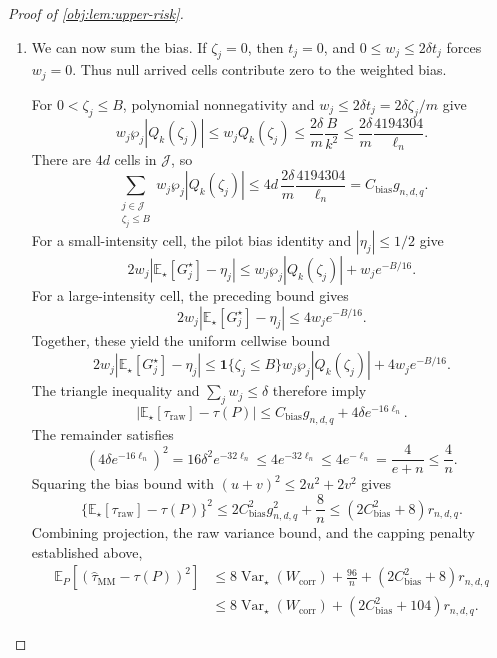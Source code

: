 \begin{proof}[Proof of \cref{obj:lem:upper-risk}]
\begin{enumerate}
For \(\zeta_j\ge B\), Cauchy--Schwarz and \(\wp_j^2\le\wp_j\) yield
\[
\{\wp_j|\mathbb E_\star[H_j^\star]|\}^2
\le\wp_j\mathbb E_\star[(H_j^\star)^2]
\le e^{-\zeta_j/8},
\]
and hence
\[
\wp_j|\mathbb E_\star[H_j^\star]|
\le e^{-\zeta_j/16}.
\]
Using
\(\eta_jQ_k(\zeta_j)=\eta_j-\mathbb E_\star[H_j^\star]\), we obtain
\[
\begin{aligned}
\wp_j|\eta_jQ_k(\zeta_j)|
&\le\frac{\wp_j}{2}
+\wp_j|\mathbb E_\star[H_j^\star]|\\
&\le\frac32e^{-B/16}.
\end{aligned}
\]
The pilot bias identity therefore gives, on these large-intensity cells,
\[
|\mathbb E_\star[G_j^\star]-\eta_j|
\le2e^{-B/16}.
\]

\item We can now sum the bias. If \(\zeta_j=0\), then \(t_j=0\), and
\(0\le w_j\le2\delta t_j\) forces \(w_j=0\). Thus null arrived cells contribute zero to the weighted bias.

For \(0<\zeta_j\le B\), polynomial nonnegativity and
\(w_j\le2\delta t_j=2\delta\zeta_j/m\) give
\[
w_j\wp_j|Q_k(\zeta_j)|
\le w_jQ_k(\zeta_j)
\le\frac{2\delta}{m}\frac{B}{k^2}
\le\frac{2\delta}{m}\frac{4194304}{\ell_n}.
\]
There are \(4d\) cells in \(\mathcal J\), so
\[
\sum_{\substack{j\in\mathcal J\\\zeta_j\le B}}
w_j\wp_j|Q_k(\zeta_j)|
\le
4d\,\frac{2\delta}{m}\frac{4194304}{\ell_n}
=C_{\mathrm{bias}}g_{n,d,q}.
\]
For a small-intensity cell, the pilot bias identity and
\(|\eta_j|\le1/2\) give
\[
2w_j|\mathbb E_\star[G_j^\star]-\eta_j|
\le w_j\wp_j|Q_k(\zeta_j)|+w_je^{-B/16}.
\]
For a large-intensity cell, the preceding bound gives
\[
2w_j|\mathbb E_\star[G_j^\star]-\eta_j|
\le4w_je^{-B/16}.
\]
Together, these yield the uniform cellwise bound
\[
2w_j|\mathbb E_\star[G_j^\star]-\eta_j|
\le
\mathbf1\{\zeta_j\le B\}w_j\wp_j|Q_k(\zeta_j)|
+4w_je^{-B/16}.
\]
The triangle inequality and \(\sum_jw_j\le\delta\) therefore imply
\[
|\mathbb E_\star[\tau_{\mathrm{raw}}]-\tau(P)|
\le C_{\mathrm{bias}}g_{n,d,q}
+4\delta e^{-16\ell_n}.
\]
The remainder satisfies
\[
(4\delta e^{-16\ell_n})^2
=16\delta^2e^{-32\ell_n}
\le4e^{-32\ell_n}
\le4e^{-\ell_n}
=\frac4{e+n}
\le\frac4n.
\]
Squaring the bias bound with \((u+v)^2\le2u^2+2v^2\) gives
\[
\{\mathbb E_\star[\tau_{\mathrm{raw}}]-\tau(P)\}^2
\le
2C_{\mathrm{bias}}^2g_{n,d,q}^2+\frac8n
\le(2C_{\mathrm{bias}}^2+8)r_{n,d,q}.
\]
Combining projection, the raw variance bound, and the capping penalty established above,
\[
\begin{aligned}
\mathbb E_P[(\widehat\tau_{\mathrm{MM}}-\tau(P))^2]
&\le
8\operatorname{Var}_\star(W_{\mathrm{corr}})
+\frac{96}{n}
+(2C_{\mathrm{bias}}^2+8)r_{n,d,q}\\
&\le
8\operatorname{Var}_\star(W_{\mathrm{corr}})
+(2C_{\mathrm{bias}}^2+104)r_{n,d,q}.
\end{aligned}
\]


\end{enumerate}
\end{proof}

